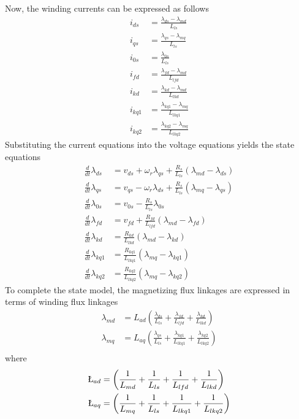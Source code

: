 %
Now, the winding currents can be expressed as follows
\begin{align}
  i_{ds} &= \frac{\lambda_{ds} - \lambda_{md}}{L_{ls}} \\
  i_{qs} &= \frac{\lambda_{qs} - \lambda_{mq}}{L_{ls}} \\
  i_{0s} &= \frac{\lambda_{0s}}{L_{ls}} \\
  i_{fd} &= \frac{\lambda_{fd} - \lambda_{md}}{L_{lfd}} \\
  i_{kd} &= \frac{\lambda_{kd} - \lambda_{md}}{L_{lkd}} \\
  i_{kq1} &= \frac{\lambda_{kq1} - \lambda_{mq}}{L_{lkq1}} \\
  i_{kq2} &= \frac{\lambda_{kq2} - \lambda_{mq}}{L_{lkq2}}
\end{align}
%
Substituting the current equations into the voltage equations yields the state equations
%
\begin{align}
  \frac{d}{dt} \lambda_{ds} &= v_{ds} + \omega_r \lambda_{qs} + \frac{R_s}{L_{ls}} \left( \lambda_{md} - \lambda_{ds} \right) \\
  \frac{d}{dt} \lambda_{qs} &= v_{qs} - \omega_r \lambda_{ds} + \frac{R_s}{L_{ls}} \left( \lambda_{mq} - \lambda_{qs} \right) \\
  \frac{d}{dt} \lambda_{0s} &= v_{0s} - \frac{R_s}{L_{ls}} \lambda_{0s} \\
  \frac{d}{dt} \lambda_{fd} &= v_{fd} + \frac{R_{fd}}{L_{lfd}} \left( \lambda_{md} - \lambda_{fd} \right) \\
  \frac{d}{dt} \lambda_{kd} &= \frac{R_{kd}}{L_{lkd}} \left( \lambda_{md} - \lambda_{kd} \right) \\
  \frac{d}{dt} \lambda_{kq1} &= \frac{R_{kq1}}{L_{lkq1}} \left( \lambda_{mq} - \lambda_{kq1} \right) \\
  \frac{d}{dt} \lambda_{kq2} &= \frac{R_{kq2}}{L_{lkq2}} \left( \lambda_{mq} - \lambda_{kq2} \right)
\end{align}
%
To complete the state model, the magnetizing flux linkages are expressed in terms of winding flux linkages
%
\begin{align}
  \lambda_{md} &=  L_{ad} \left( \frac{\lambda_{ds}}{L_{ls}} + \frac{\lambda_{fd}}{L_{lfd}} + \frac{\lambda_{kd}}{L_{lkd}} \right) \\
  \lambda_{mq} &=  L_{aq} \left( \frac{\lambda_{qs}}{L_{ls}} + \frac{\lambda_{kq1}}{L_{lkq1}} + \frac{\lambda_{kq2}}{L_{lkq2}} \right) \\
\end{align}
%
where
%
\begin{align}
  \L_{ad} &=  \left( \frac{1}{L_{md}} + \frac{1}{L_{ls}} + \frac{1}{L_{lfd}} + \frac{1}{L_{lkd}} \right) \\
  \L_{aq} &=  \left( \frac{1}{L_{mq}} + \frac{1}{L_{ls}} + \frac{1}{L_{lkq1}} + \frac{1}{L_{lkq2}} \right) \\
\end{align}

